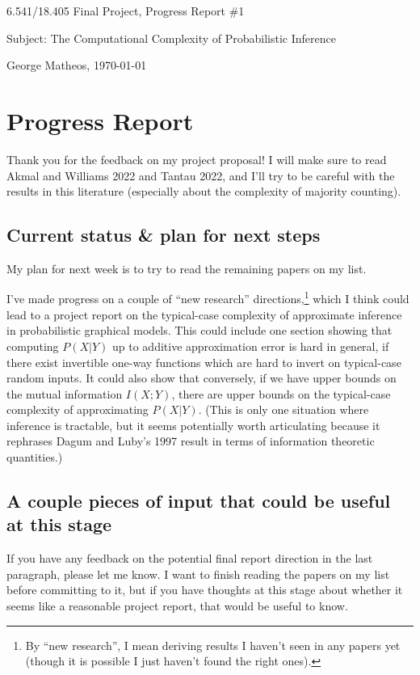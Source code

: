 \documentclass{article}
\begin{document}
\begin{center}
    \Large
    6.541/18.405 Final Project, Progress Report \#1

    \vspace{3pt}
    Subject: The Computational Complexity of Probabilistic Inference

    \vspace{3pt}
    \normalsize
    George Matheos, \today
\end{center}

\section{Progress Report}

Thank you for the feedback on my project proposal!
I will make sure to read Akmal and Williams 2022 and Tantau 2022, and I'll try to be careful with the results in this literature (especially about the complexity of majority counting).

\subsection{Current status \& plan for next steps}

My plan for next week is to try to read the remaining papers on my list.

I've made progress on a couple of ``new research'' directions,\footnote{By ``new research'', I mean deriving results I haven't seen in any papers yet (though it is possible I just haven't found the right ones).} which I think could lead to a project report on the typical-case complexity of approximate inference in probabilistic graphical models.
This could include one section showing that computing $P(X | Y)$ up to additive approximation error is hard in general, if there exist invertible one-way functions which are hard to invert on typical-case random inputs.
It could also show that conversely, if we have upper bounds on the mutual information $I(X ; Y)$, there are upper bounds on the typical-case complexity of approximating $P(X | Y)$.
(This is only one situation where inference is tractable, but it seems potentially worth articulating because it rephrases Dagum and Luby's 1997 result in terms of information theoretic quantities.)


\subsection{A couple pieces of input that could be useful at this stage}
If you have any feedback on the potential final report direction in the last paragraph, please let me know.
I want to finish reading the papers on my list before committing to it, but if you have thoughts at this stage about whether it seems like a reasonable project report, that would be useful to know.
\end{document}

